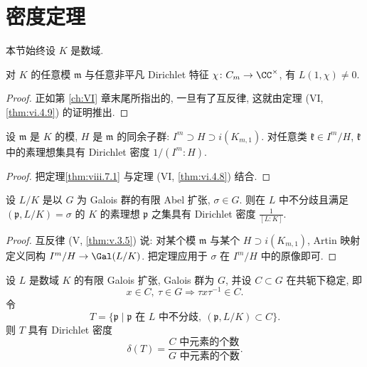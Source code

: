 \section{密度定理}\label{sec:VIII.7}

本节始终设 $K$ 是数域.

\begin{theorem}\label{thm:viii.7.1}
对 $K$ 的任意模 $\mathfrak{m}$ 与任意非平凡 Dirichlet 特征 $\chi\colon C_m\to\CC^{\times}$, 有 $L(1,\chi)\ne 0$.
\end{theorem}

\begin{proof}
正如第 \ref{ch:VI} 章末尾所指出的, 一旦有了互反律, 这就由定理 (VI, \ref{thm:vi.4.9}) 的证明推出.
\end{proof}

\begin{theorem}\label{thm:viii.7.2}
设 $\mathfrak{m}$ 是 $K$ 的模, $H$ 是 $\mathfrak{m}$ 的同余子群: $I^{m}\supset H\supset i(K_{m,1})$. 对任意类 $\mathfrak{k}\in I^{m}/H$, $\mathfrak{k}$ 中的素理想集具有 Dirichlet 密度 $1/(I^{m}:H)$.
\end{theorem}

\begin{proof}
把定理\ref{thm:viii.7.1} 与定理 (VI, \ref{thm:vi.4.8}) 结合.
\end{proof}

\begin{corollary}\label{cor:viii.7.3}
设 $L/K$ 是以 $G$ 为 Galois 群的有限 Abel 扩张, $\sigma\in G$. 则在 $L$ 中不分歧且满足 $(\mathfrak{p},L/K)=\sigma$ 的 $K$ 的素理想 $\mathfrak{p}$ 之集具有 Dirichlet 密度 $\frac{1}{[L:K]}$.
\end{corollary}

\begin{proof}
互反律 (V, \ref{thm:v.3.5}) 说: 对某个模 $\mathfrak{m}$ 与某个 $H\supset i(K_{m,1})$, Artin 映射定义同构 $I^{m}/H\to\Gal(L/K)$. 把定理应用于 $\sigma$ 在 $I^{m}/H$ 中的原像即可.
\end{proof}

\begin{theorem}[CHEBOTAREV]\label{thm:viii.7.4}
设 $L$ 是数域 $K$ 的有限 Galois 扩张, Galois 群为 $G$, 并设 $C\subset G$ 在共轭下稳定, 即
\[
x\in C,\ \tau\in G\Rightarrow\tau x\tau^{-1}\in C.
\]
令
\[
T=\{\mathfrak{p}\mid \mathfrak{p} \text{ 在 } L \text{ 中不分歧},\ (\mathfrak{p},L/K)\subset C\}.
\]
则 $T$ 具有 Dirichlet 密度
\[
\delta(T)=\frac{C \text{ 中元素的个数}}{G \text{ 中元素的个数}}.
\]
\end{theorem}

